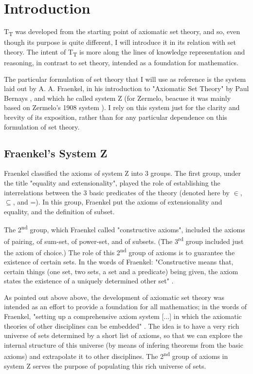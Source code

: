 \documentclass{IOS-Book-Article}     %
\begin{document}

\section{Introduction}
T\textsubscript{T} was developed from the starting point of axiomatic set
theory, and so, even though its purpose is quite different, I will introduce
it in its relation with set theory. The intent of T\textsubscript{T} is more
along the lines of knowledge representation and reasoning, in contrast to set
theory, intended as a foundation for mathematics.

The particular formulation of set theory that I will use as reference is the
system laid out by A. A. Fraenkel, in his introduction to
"Axiomatic Set Theory" by Paul Bernays \cite{r1}, and which he called system Z
(for Zermelo, beacuse it was mainly based on Zermelo's 1908 system \cite{r2}).
I rely on this system just for the clarity and brevity of its exposition, rather
than for any particular dependence on this formulation of set theory.

\subsection{Fraenkel's System Z}
Fraenkel classified the axioms of system Z into 3 groups. The first group,
under the title "equality and extensionality", played the role of
establishing the interrelations between the 3 basic predicates of the theory
(denoted here by $\in$, $\subseteq$, and =). In this group,
Fraenkel put the axioms of extensionality and equality, and the definition of
subset.

The 2\textsuperscript{nd} group, which Fraenkel called "constructive axioms",
included the axioms of pairing, of sum-set, of power-set, and of subsets. (The
3\textsuperscript{rd} group included just the axiom of choice.)
The role of this 2\textsuperscript{nd} group of axioms is to
guarantee the existence of certain sets.  In the words of Fraenkel:
"Constructive means that, certain things (one set, two sets, a set and a
predicate) being given, the axiom states the existence of a uniquely determined
other set" \cite{r1}.

As pointed out above above, the development of axiomatic set theory was
intended as an effort to provide a foundation for all mathematics; in the words
of Fraenkel, "setting up a comprehensive axiom system [...] in which the
axiomatic theories of other disciplines can be embedded" \cite{r1}. The idea is
to have a very rich universe of sets determined by a short list of axioms, so
that we can explore the internal structure of this universe (by means of
infering theorems from the basic axioms) and extrapolate it to other
disciplines. The 2\textsuperscript{nd} group of axioms in system Z serves the
purpose of populating this rich universe of sets.
\end{document}
